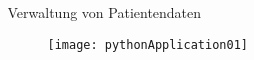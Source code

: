 \begin{frame}[t]
\begin{columns}[t]
\begin{column}{.025\textwidth}\end{column} %

\begin{column}{0.465\textwidth}

\begin{block}{Verwaltung von Patientendaten}

    \begin{figure}
        \centering
        
        \texttt{[image: pythonApplication01]}
                
    \end{figure}
%
% 
    
\end{block}


\end{column}

\begin{column}{.025\textwidth}\end{column} %

\end{columns} %



\begin{columns}[t] %


\end{columns}
\end{frame}

